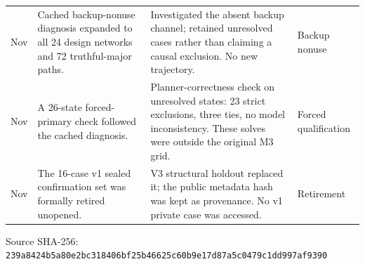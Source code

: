 \documentclass[preprint,11pt,authoryear]{elsarticle}
\newif\ifprovenance\provenancetrue
\begin{document}
\begin{longtable}{>{\raggedright\arraybackslash}p{1.1cm}>{\raggedright\arraybackslash}p{4.6cm}>{\raggedright\arraybackslash}p{6.2cm}>{\raggedright\arraybackslash}p{2.7cm}}
12 Nov & Cached backup-nonuse diagnosis expanded to all 24 design networks and 72 truthful-major paths. & Investigated the absent backup channel; retained unresolved cases rather than claiming a causal exclusion. No new trajectory. & Backup nonuse \\
12 Nov & A 26-state forced-primary check followed the cached diagnosis. & Planner-correctness check on unresolved states: 23 strict exclusions, three ties, no model inconsistency. These solves were outside the original M3 grid. & Forced qualification \\
13 Nov & The 16-case v1 sealed confirmation set was formally retired unopened. & V3 structural holdout replaced it; the public metadata hash was kept as provenance. No v1 private case was accessed. & Retirement \\
\end{longtable}
\ifprovenance\noindent\scriptsize Source SHA-256: \texttt{239a8424b5a80e2bc318406bf25b46625c60b9e17d87a5c0479c1dd997af9390}\par\fi
\endgroup
\end{document}
